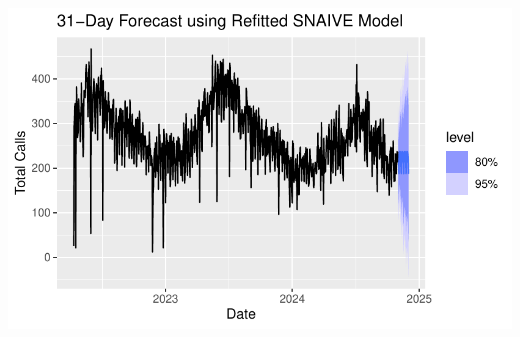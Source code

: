 \documentclass[
  letterpaper,
  DIV=11,
  numbers=noendperiod]{scrartcl}
\begin{document}
\includegraphics{final_proj_group1_files/figure-pdf/SNAIVE_model-1.pdf}
\end{document}
